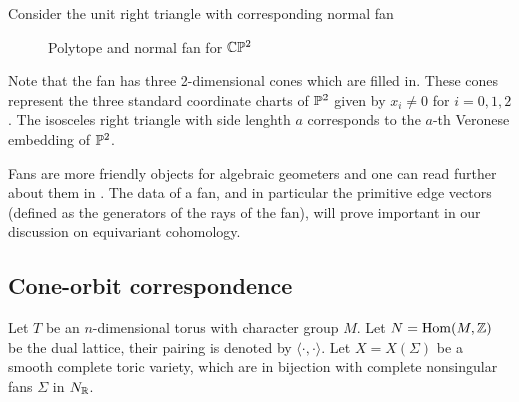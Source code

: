 \begin{example}
    Consider the unit right triangle with corresponding normal fan
    \begin{figure}[H]
        \caption{Polytope and normal fan for $\C\P^2$}
    \end{figure}
    Note that the fan has three 2-dimensional cones which are filled in.
    These cones represent the three standard coordinate charts of $\P^2$ given by
    $x_i \neq 0$ for $i = 0,1,2$. The isosceles right triangle with
    side lenghth $a$ corresponds to the $a$-th Veronese 
    embedding of $\P^2$.
\end{example}
Fans are more friendly objects for algebraic geometers and 
one can read further about them in \cite{cls}. The data of a fan,
and in particular the primitive edge vectors (defined as the generators of the rays of the fan),
will prove important in our discussion on equivariant cohomology.

\subsection{Cone-orbit correspondence}
Let $T$ be an $n$-dimensional torus with character group $M$. Let $N = \Hom(M,\Z)$ be the
dual lattice, their pairing is denoted by $\langle \cdot,\cdot\rangle$. Let $X = X(\Sigma)$ be a smooth complete toric variety, which are in bijection with complete nonsingular fans $\Sigma$ in $N_\R$.


